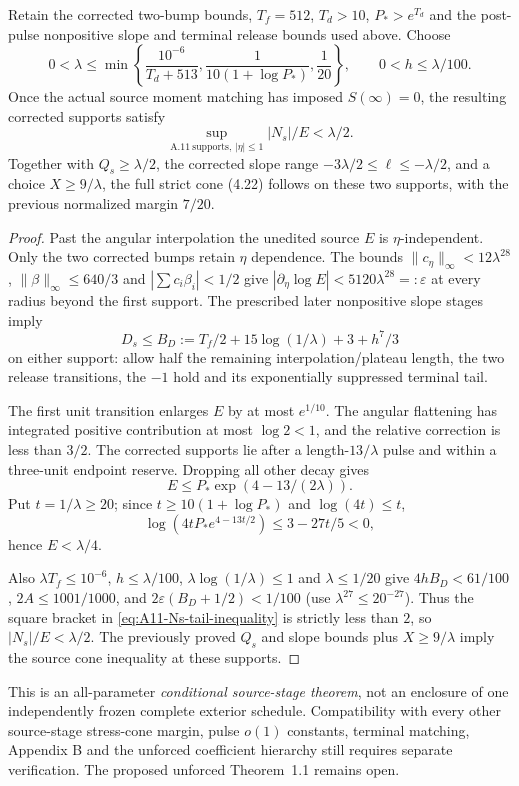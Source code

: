 \begin{theorem}
\label{thm:A11-Ns-realized}
Retain the corrected two-bump bounds, $T_f=512$, $T_d>10$,
$P_*>e^{T_d}$ and the post-pulse nonpositive slope and terminal
release bounds used above. Choose
\[
0<\lambda\le\min\left\{
\frac{10^{-6}}{T_d+513},\frac1{10(1+\log P_*)},
\frac1{20}\right\},\qquad0<h\le\lambda/100.
\]
Once the actual source moment matching has imposed $S(\infty)=0$,
the resulting corrected supports satisfy
\begin{equation}\label{eq:A11-Ns-final}
\sup_{\mathrm{A.11\ supports},\,|\eta|\le1}|N_s|/E<\lambda/2.
\end{equation}
Together with $Q_s\ge\lambda/2$, the corrected slope range
$-3\lambda/2\le\ell\le-\lambda/2$, and a choice
$X\ge9/\lambda$, the full strict cone (4.22) follows on these
two supports, with the previous normalized margin $7/20$.
\end{theorem}
\begin{proof}
Past the angular interpolation the unedited source $E$ is
$\eta$-independent. Only the two corrected bumps retain
$\eta$ dependence. The bounds
$\|c_\eta\|_\infty<12\lambda^{28}$,
$\|\beta\|_\infty\le640/3$ and
$|\sum c_i\beta_i|<1/2$ give
$|\partial_\eta\log E|<5120\lambda^{28}=:\varepsilon$
at every radius beyond the first support.
The prescribed later nonpositive slope stages imply
\[
D_s\le B_D:=T_f/2+15\log(1/\lambda)+3+h^7/3
\]
on either support: allow half the remaining interpolation/plateau
length, the two release transitions, the $-1$ hold and its
exponentially suppressed terminal tail.

The first unit transition enlarges $E$ by at most $e^{1/10}$.
The angular flattening has integrated positive contribution at
most $\log2<1$, and the relative correction is less than $3/2$.
The corrected supports lie after a length-$13/\lambda$ pulse
and within a three-unit endpoint reserve. Dropping all other
decay gives
\[
 E\le P_*\exp(4-13/(2\lambda)).
\]
Put $t=1/\lambda\ge20$; since
$t\ge10(1+\log P_*)$ and $\log(4t)\le t$,
\[
\log(4tP_*e^{4-13t/2})\le3-27t/5<0,
\]
hence $E<\lambda/4$.

Also $\lambda T_f\le10^{-6}$, $h\le\lambda/100$,
$\lambda\log(1/\lambda)\le1$ and $\lambda\le1/20$ give
$4hB_D<61/100$, $2A\le1001/1000$, and
$2\varepsilon(B_D+1/2)<1/100$ (use
$\lambda^{27}\le20^{-27}$). Thus the square bracket in
\eqref{eq:A11-Ns-tail-inequality} is strictly less than $2$,
so $|N_s|/E<\lambda/2$. The previously proved
$Q_s$ and slope bounds plus $X\ge9/\lambda$ imply the
source cone inequality at these supports.
\end{proof}

This is an all-parameter \emph{conditional source-stage theorem},
not an enclosure of one independently frozen complete exterior
schedule. Compatibility with every other source-stage stress-cone
margin, pulse $o(1)$ constants, terminal matching, Appendix B
and the unforced coefficient hierarchy still requires separate
verification. The proposed unforced Theorem~1.1 remains open.
